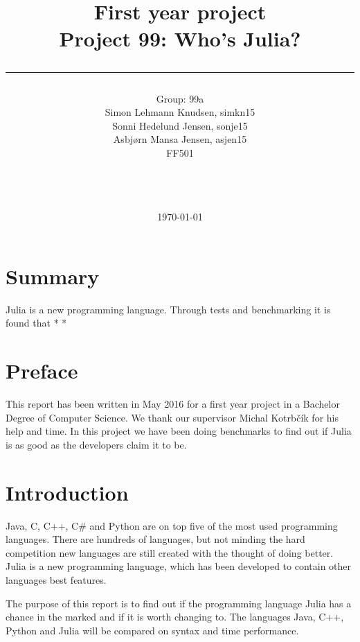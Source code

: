 \documentclass[a4paper, 11pt, titlepage]{article}
\title{First year project\\Project 99: Who's Julia?\\\rule{10cm}{0.5mm}}
\author{Group: 99a\\Simon Lehmann Knudsen, simkn15\\Sonni Hedelund Jensen, sonje15\\Asbjørn Mansa Jensen, asjen15
	\\ FF501\\\rule{5.5cm}{0.5mm}\\}
\date{\today}
\begin{document}
\maketitle

\vfill

\newpage
{}
\section{Summary}
Julia is a new programming language. Through tests and benchmarking it is found that * *

\section{Preface}
This report has been written in May 2016 for a first year project in a Bachelor Degree of Computer Science. We thank our supervisor Michal Kotrbčík for his help and time.
In this project we have been doing benchmarks to find out if Julia is as good as the developers claim it to be. 

\newpage
\tableofcontents

\newpage
{}
\pagestyle{fancy}
\fancyhf{}
\section{Introduction}
Java, C, C++, C\# and Python are on top five of the most used programming languages. There are hundreds of languages, but not minding the hard competition new languages are still created with the thought of doing better. Julia is a new programming language, which has been developed to contain other languages best features.

The purpose of this report is to find out if the programming language Julia has a chance in the marked and if it is worth changing to. The languages Java, C++, Python and Julia will be compared on syntax and time performance.  
\end{document}
